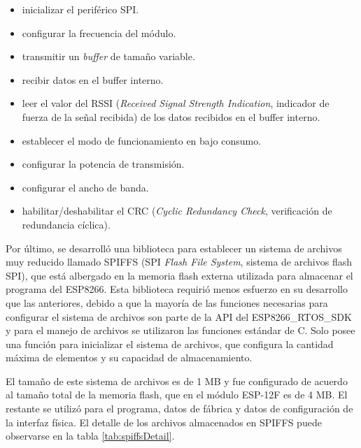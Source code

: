 \begin{itemize}
	\item inicializar el periférico SPI.
	\item configurar la frecuencia del módulo.
	\item transmitir un \textit{buffer} de tamaño variable.
	\item recibir datos en el buffer interno.
	\item leer el valor del RSSI (\textit{Received Signal Strength Indication}, indicador de fuerza de la señal recibida) de los datos recibidos en el buffer interno.
	\item establecer el modo de funcionamiento en bajo consumo.
	\item configurar la potencia de transmisión.
	\item configurar el ancho de banda.
	\item habilitar/deshabilitar el CRC (\textit{Cyclic Redundancy Check}, verificación de redundancia cíclica).
\end{itemize}

Por último, se desarrolló una biblioteca para establecer un sistema de archivos muy reducido llamado SPIFFS (SPI \textit{Flash File System}, sistema de archivos flash SPI), que está albergado en la memoria flash externa utilizada para almacenar el programa del ESP8266. Esta biblioteca requirió menos esfuerzo en su desarrollo que las anteriores, debido a que la mayoría de las funciones necesarias para configurar el sistema de archivos son parte de la API del ESP8266\_RTOS\_SDK y para el manejo de archivos se utilizaron las funciones estándar de C. Solo posee una función para inicializar el sistema de archivos, que configura la cantidad máxima de elementos y su capacidad de almacenamiento.

El tamaño de este sistema de archivos es de 1 MB y fue configurado de acuerdo al tamaño total de la memoria flash, que en el módulo ESP-12F es de 4 MB. El restante se utilizó para el programa, datos de fábrica y datos de configuración de la interfaz física. El detalle de los archivos almacenados en SPIFFS puede observarse en la tabla \ref{tab:spiffsDetail}.

